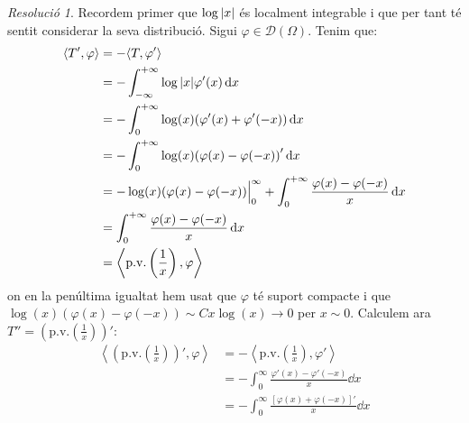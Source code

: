 \documentclass[10pt,a4paper]{article}
\theoremstyle{definition}
\theoremstyle{remark}
\newtheorem*{res}{Resolució}
\renewcommand{\pv}{\mathrm{p.v.}} %
\begin{document}
\begin{res}
  Recordem primer que $\log\abs{x}$ és localment integrable i que per tant té sentit considerar la seva distribució. Sigui $\varphi\in\mathcal{D}(\Omega)$. Tenim que:
  \begin{align*}
    \langle T',\varphi\rangle & = -\langle T, \varphi'\rangle                                                                              \\
                              & = -\int_{-\infty}^{+\infty} \log\abs{x}\varphi'(x)\dd{x}                                                   \\
                              & = -\int_{0}^{+\infty} \log(x)(\varphi'(x)+\varphi'(-x))\dd{x}                                              \\
                              & = -\int_{0}^{+\infty} \log(x){(\varphi(x)-\varphi(-x))}'\dd{x}                                             \\
                              & = -\log(x)(\varphi(x)-\varphi(-x))\Big|_0^\infty+\int_{0}^{+\infty} \frac{\varphi(x)-\varphi(-x)}{x}\dd{x} \\
                              & = \int_{0}^{+\infty} \frac{\varphi(x)-\varphi(-x)}{x}\dd{x}                                                \\
                              & =\left\langle\pv\left(\frac{1}{x}\right),\varphi\right\rangle
  \end{align*}
  on en la penúltima igualtat hem usat que $\varphi$ té suport compacte i que $\log(x)(\varphi(x)-\varphi(-x))\sim Cx\log(x)\to 0$ per $x\sim 0$. Calculem ara $T''={\left(\pv\left(\frac{1}{x}\right)\right)}'$:
  \begin{align*}
    \left\langle {\left(\pv\left(\frac{1}{x}\right)\right)}',\varphi\right\rangle & = -\left\langle \pv\left(\frac{1}{x}\right),\varphi'\right\rangle                                                                                                                                                                       \\
                                                                                  & =-\int_0^\infty \frac{\varphi'(x)-\varphi'(-x)}{x}\dd{x}                                                                                                                                                                                \\
                                                                                  & =-\int_0^\infty \frac{{\left[\varphi(x)+\varphi(-x)\right]}'}{x}\dd{x}                                                                                                                                                                  \\

\end{align*}
\end{res}
\end{document}

